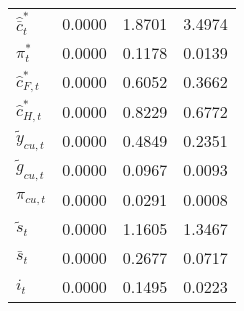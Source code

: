 \begin{center}
\begin{longtable}{lccc}
${\hat {\bar c}_t^*}  $	 & 	       0.0000	 & 	       1.8701	 & 	       3.4974 \\ 
${\pi_t^*}            $	 & 	       0.0000	 & 	       0.1178	 & 	       0.0139 \\ 
${\hat c_{F,t}^*}     $	 & 	       0.0000	 & 	       0.6052	 & 	       0.3662 \\ 
${\hat c_{H,t}^*}     $	 & 	       0.0000	 & 	       0.8229	 & 	       0.6772 \\ 
${\tilde y_{cu,t}}    $	 & 	       0.0000	 & 	       0.4849	 & 	       0.2351 \\ 
${\tilde g_{cu,t}}    $	 & 	       0.0000	 & 	       0.0967	 & 	       0.0093 \\ 
${\pi_{cu,t}}         $	 & 	       0.0000	 & 	       0.0291	 & 	       0.0008 \\ 
${\tilde s_t}         $	 & 	       0.0000	 & 	       1.1605	 & 	       1.3467 \\ 
${\bar s_t}           $	 & 	       0.0000	 & 	       0.2677	 & 	       0.0717 \\ 
${i_t}                $	 & 	       0.0000	 & 	       0.1495	 & 	       0.0223 \\ 
\end{longtable}
 \end{center}
